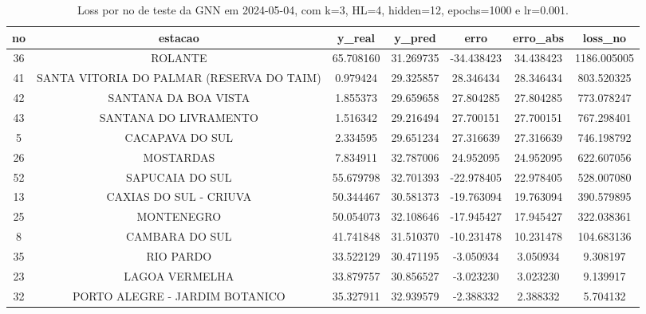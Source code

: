 \begin{table}[h]
\centering
\caption{Loss por no de teste da GNN em 2024-05-04, com k=3, HL=4, hidden=12, epochs=1000 e lr=0.001.}
\label{tab:gnn_loss_k3_hl4_h12_e1000_d20240504}
\begin{tabular}{ccccccc}
\toprule
no & estacao & y\_real & y\_pred & erro & erro\_abs & loss\_no \\
\midrule
36 & ROLANTE & 65.708160 & 31.269735 & -34.438423 & 34.438423 & 1186.005005 \\
41 & SANTA VITORIA DO PALMAR (RESERVA DO TAIM) & 0.979424 & 29.325857 & 28.346434 & 28.346434 & 803.520325 \\
42 & SANTANA DA BOA VISTA & 1.855373 & 29.659658 & 27.804285 & 27.804285 & 773.078247 \\
43 & SANTANA DO LIVRAMENTO & 1.516342 & 29.216494 & 27.700151 & 27.700151 & 767.298401 \\
5 & CACAPAVA DO SUL & 2.334595 & 29.651234 & 27.316639 & 27.316639 & 746.198792 \\
26 & MOSTARDAS & 7.834911 & 32.787006 & 24.952095 & 24.952095 & 622.607056 \\
52 & SAPUCAIA DO SUL & 55.679798 & 32.701393 & -22.978405 & 22.978405 & 528.007080 \\
13 & CAXIAS DO SUL - CRIUVA & 50.344467 & 30.581373 & -19.763094 & 19.763094 & 390.579895 \\
25 & MONTENEGRO & 50.054073 & 32.108646 & -17.945427 & 17.945427 & 322.038361 \\
8 & CAMBARA DO SUL & 41.741848 & 31.510370 & -10.231478 & 10.231478 & 104.683136 \\
35 & RIO PARDO & 33.522129 & 30.471195 & -3.050934 & 3.050934 & 9.308197 \\
23 & LAGOA VERMELHA & 33.879757 & 30.856527 & -3.023230 & 3.023230 & 9.139917 \\
32 & PORTO ALEGRE - JARDIM BOTANICO & 35.327911 & 32.939579 & -2.388332 & 2.388332 & 5.704132 \\
\bottomrule
\end{tabular}
\end{table}
